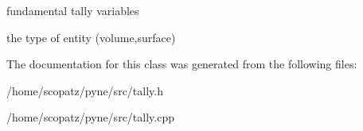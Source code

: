 fundamental tally variables 

the type of entity (volume,surface) 

The documentation for this class was generated from the following files\-:\begin{DoxyCompactItemize}
\item 
/home/scopatz/pyne/src/tally.\-h\item 
/home/scopatz/pyne/src/tally.\-cpp\end{DoxyCompactItemize}
